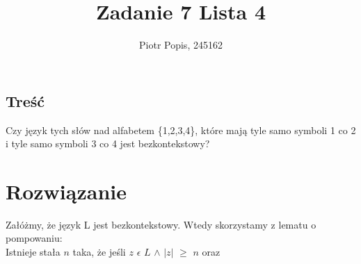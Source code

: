 \documentclass[11pt]{article}
\begin{document}
\title{Zadanie 7 Lista 4}
\author{Piotr Popis, 245162}
\maketitle
\centering

\begin{flushleft}
\section{Treść}
Czy język tych słów nad alfabetem \{1,2,3,4\}, które mają tyle samo symboli 1 co 2 i tyle samo symboli 3 co 4 jest bezkontekstowy?
\end{flushleft}

\section{Rozwiązanie}
Załóżmy, że język L jest bezkontekstowy.
Wtedy skorzystamy z lematu o pompowaniu:\\
Istnieje stała $n$ taka, że jeśli $z$ $\epsilon$ $ L$ $\wedge$ $| z |$ $\geq$ $n$  oraz \\
\end{document}
